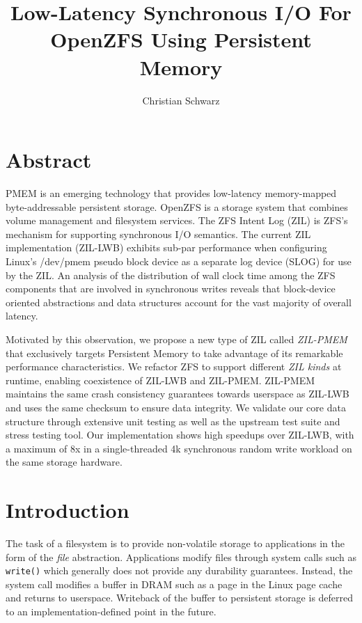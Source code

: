 \documentclass[12pt,a4paper,twoside]{book}
\begin{document}
\frontmatter
{}

\title{Low-Latency Synchronous I/O For OpenZFS Using Persistent Memory}
\author{Christian Schwarz}
\maketitle



\chapter{Abstract}
PMEM is an emerging technology that provides low-latency memory-mapped byte-addressable persistent storage.
OpenZFS is a storage system that combines volume management and filesystem services.
The ZFS Intent Log (ZIL) is ZFS's mechanism for supporting synchronous I/O semantics.
The current ZIL implementation (ZIL-LWB) exhibits sub-par performance when configuring Linux's \mbox{/dev/pmem} pseudo block device as a separate log device (SLOG) for use by the ZIL.
An analysis of the distribution of wall clock time among the ZFS components that are involved in synchronous writes reveals that block-device oriented abstractions and data structures account for the vast majority of overall latency.

Motivated by this observation, we propose a new type of ZIL called \textit{ZIL-PMEM} that exclusively targets Persistent Memory to take advantage of its remarkable performance characteristics.
We refactor ZFS to support different \textit{ZIL kinds} at runtime, enabling coexistence of ZIL-LWB and ZIL-PMEM.
ZIL-PMEM maintains the same crash consistency guarantees towards userspace as ZIL-LWB and uses the same checksum to ensure data integrity.
We validate our core data structure through extensive unit testing as well as the upstream test suite and stress testing tool.
Our implementation shows high speedups over ZIL-LWB, with a maximum of 8x in a single-threaded 4k synchronous random write workload on the same storage hardware.

\mainmatter
\cleardoublepage
{}
{}
\tableofcontents

\listoftodos

\chapter{Introduction}
The task of a filesystem is to provide non-volatile storage to applications in the form of the \textit{file} abstraction.
Applications modify files through system calls such as \lstinline{write()} which generally does not provide any durability guarantees.
Instead, the system call modifies a buffer in DRAM such as a page in the Linux page cache and returns to userspace.
Writeback of the buffer to persistent storage is deferred to an implementation-defined point in the future.
\end{document}
